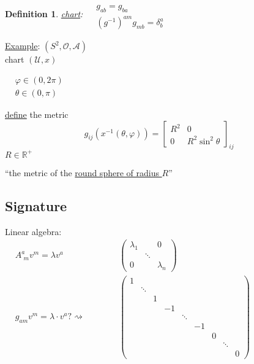 \documentclass[10pt, twoside]{amsart}
\newtheorem{definition}{Definition}
\begin{document}
\begin{multicols*}{2}
\begin{definition}
\underline{chart}: $\begin{aligned} & \quad \\ 
  & g_{ab} = g_{ba} \\
  & (g^{-1})^{am} g_{mb} = \delta^a_b \end{aligned}$


\end{definition}

\underline{Example}: $(S^2, \mathcal{O}, \mathcal{A})$ \\ 
\phantom{example } chart $(\mathcal{U}, x)$

$\begin{aligned} 
 & \varphi \in (0,2\pi ) \\ 
  & \theta \in (0,\pi)\end{aligned}$

\underline{define} the metric
\[
g_{ij}(x^{-1}(\theta,\varphi)) = \left[ \begin{matrix} R^2 & 0 \\
    0 & R^2\sin^2{\theta} \end{matrix} \right]_{ij}
\]
$R \in \mathbb{R}^+$

``the metric of the \underline{round sphere of radius $R$}''

\subsection{Signature} 

Linear algebra: \quad \quad \, $ \begin{aligned} & A^a_{\,\,m}v^m = \lambda v^a & \quad \quad \quad \, \left( \begin{matrix} \lambda_1 & & 0 \\
    & \ddots & \\ 
    0 & & \lambda_n \end{matrix} \right) \\
  & g_{am} v^m = \lambda \cdot v^a ? \rightsquigarrow  & \quad \quad \quad \, \left( \begin{matrix} 
    1        &   &    &        &    &   &        & \\
    & \ddots &   &    &        &    &   &        & \\
    &        & 1 &    &        &    &   &        & \\
    &        &   & -1 &        &    &   &        & \\
    &        &   &    & \ddots &    &   &        & \\
    &        &   &    &        & -1 &   &        & \\
    &        &   &    &        &    & 0 &        & \\
    &        &   &    &        &    &   & \ddots & \\
    &        &   &    &        &    &   &        & 0 \end{matrix} \right)
\end{aligned}$


\end{multicols*}
\end{document}

